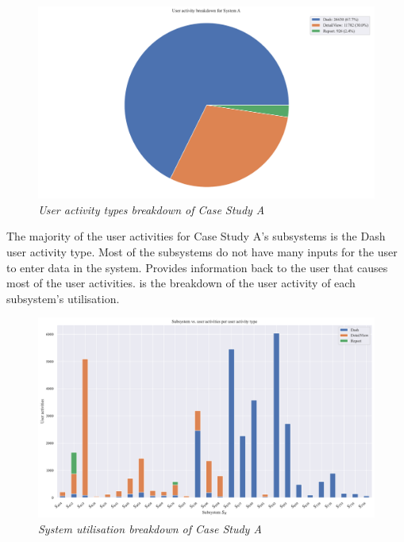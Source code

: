 \begin{figure}[!htb]
	\centering %
	\includegraphics[width=0.95\linewidth]{img/ch3/analysis/case_A_breakdown.pdf}
	\caption[User activity types breakdown of Case Study A]
	{\textit{User activity types breakdown of Case Study A}}\label{fig:ch3_caseABreakdown}
\end{figure} 

The  majority of the user activities for Case Study A's subsystems is the Dash user activity type. Most of the subsystems do not have many inputs for the user to enter data in the system. Provides information back to the user that causes most of the user activities.  is the breakdown of the user activity of each subsystem's utilisation.

\begin{figure}[!htb]
	\centering %
	\includegraphics[width=0.95\linewidth]{img/ch3/analysis/case_A_subsystems_1.pdf}
	\caption[System utilisation breakdown of Case Study A]
	{\textit{System utilisation breakdown of Case Study A}}\label{fig:ch3_caseAAnalysis}
\end{figure}


